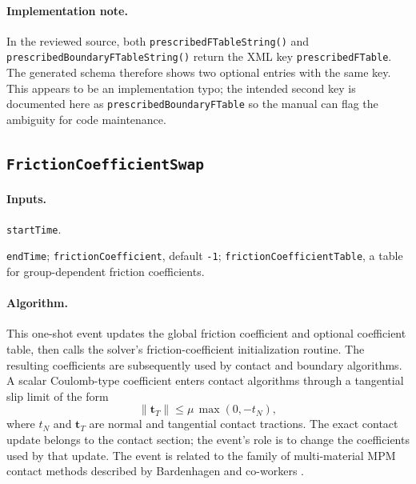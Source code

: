 \paragraph{Implementation note.}
In the reviewed source, both \texttt{prescribedFTableString()} and \texttt{prescribedBoundaryFTableString()} return the XML key \texttt{prescribedFTable}.  The generated schema therefore shows two optional entries with the same key.  This appears to be an implementation typo; the intended second key is documented here as \texttt{prescribedBoundaryFTable} so the manual can flag the ambiguity for code maintenance.

\subsection{\texttt{FrictionCoefficientSwap}}
\label{subsec:event-friction-coefficient-swap}

\paragraph{Inputs.}
\begin{description}[leftmargin=*,style=nextline]
\item[\textbf{Required.}] \texttt{startTime}.
\item[\textbf{Optional.}] \texttt{endTime}; \texttt{frictionCoefficient}, default \texttt{-1}; \texttt{frictionCoefficientTable}, a table for group-dependent friction coefficients.
\end{description}

\paragraph{Algorithm.}
This one-shot event updates the global friction coefficient and optional coefficient table, then calls the solver's friction-coefficient initialization routine.  The resulting coefficients are subsequently used by contact and boundary algorithms.  A scalar Coulomb-type coefficient enters contact algorithms through a tangential slip limit of the form
\begin{equation}
  \|\mathbf{t}_T\| \le \mu\,\max(0,-t_N),
  \label{eq:coulomb-limit}
\end{equation}
where $t_N$ and $\mathbf{t}_T$ are normal and tangential contact tractions.  The exact contact update belongs to the contact section; the event's role is to change the coefficients used by that update.  The event is related to the family of multi-material MPM contact methods described by Bardenhagen and co-workers \cite{bardenhagen2001contact,bardenhagen2000granular}.

